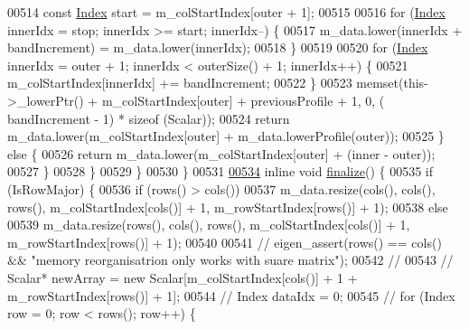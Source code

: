 \begin{DoxyCode}
00514                     \textcolor{keyword}{const} \hyperlink{group___core___module_a554f30542cc2316add4b1ea0a492ff02}{Index} start = m\_colStartIndex[outer + 1];
00515 
00516                     \textcolor{keywordflow}{for} (\hyperlink{group___core___module_a554f30542cc2316add4b1ea0a492ff02}{Index} innerIdx = stop; innerIdx >= start; innerIdx--) \{
00517                         m\_data.lower(innerIdx + bandIncrement) = m\_data.lower(innerIdx);
00518                     \}
00519 
00520                     \textcolor{keywordflow}{for} (\hyperlink{group___core___module_a554f30542cc2316add4b1ea0a492ff02}{Index} innerIdx = outer + 1; innerIdx < outerSize() + 1; innerIdx++) \{
00521                         m\_colStartIndex[innerIdx] += bandIncrement;
00522                     \}
00523                     memset(this->\_lowerPtr() + m\_colStartIndex[outer] + previousProfile + 1, 0, (
      bandIncrement - 1) * \textcolor{keyword}{sizeof} (Scalar));
00524                     \textcolor{keywordflow}{return} m\_data.lower(m\_colStartIndex[outer] + m\_data.lowerProfile(outer));
00525                 \} \textcolor{keywordflow}{else} \{
00526                     \textcolor{keywordflow}{return} m\_data.lower(m\_colStartIndex[outer] + (inner - outer));
00527                 \}
00528             \}
00529         \}
00530     \}
00531 
\hyperlink{class_eigen_1_1_skyline_matrix_a1269310d041fb3ca2a980644f3cfe5a2}{00534}     \textcolor{keyword}{inline} \textcolor{keywordtype}{void} \hyperlink{class_eigen_1_1_skyline_matrix_a1269310d041fb3ca2a980644f3cfe5a2}{finalize}() \{
00535         \textcolor{keywordflow}{if} (IsRowMajor) \{
00536             \textcolor{keywordflow}{if} (rows() > cols())
00537                 m\_data.resize(cols(), cols(), rows(), m\_colStartIndex[cols()] + 1, m\_rowStartIndex[rows()] 
      + 1);
00538             \textcolor{keywordflow}{else}
00539                 m\_data.resize(rows(), cols(), rows(), m\_colStartIndex[cols()] + 1, m\_rowStartIndex[rows()] 
      + 1);
00540 
00541             \textcolor{comment}{//            eigen\_assert(rows() == cols() && "memory reorganisatrion only works with suare
       matrix");}
00542             \textcolor{comment}{//}
00543             \textcolor{comment}{//            Scalar* newArray = new Scalar[m\_colStartIndex[cols()] + 1 +
       m\_rowStartIndex[rows()] + 1];}
00544             \textcolor{comment}{//            Index dataIdx = 0;}
00545             \textcolor{comment}{//            for (Index row = 0; row < rows(); row++) \{}

\end{DoxyCode}
